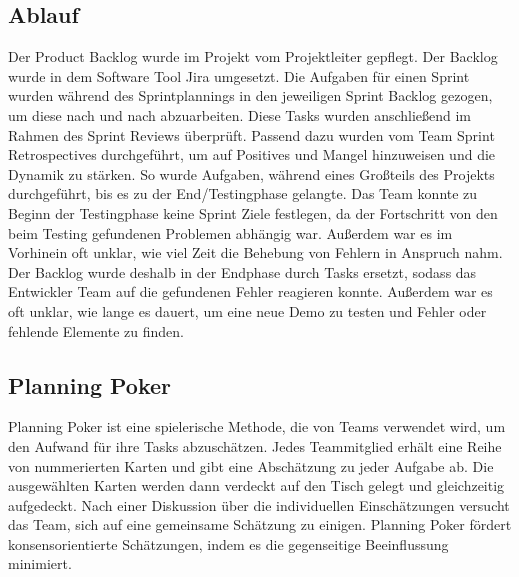 \subsection{Ablauf}\label{subsec:Ablauf}
Der Product Backlog wurde im Projekt vom Projektleiter gepflegt.
Der Backlog wurde in dem Software Tool Jira umgesetzt.
Die Aufgaben für einen Sprint wurden während des Sprintplannings in den jeweiligen Sprint Backlog gezogen, um diese nach und nach abzuarbeiten.
Diese Tasks wurden anschließend im Rahmen des Sprint Reviews überprüft.
Passend dazu wurden vom Team Sprint Retrospectives durchgeführt, um auf Positives und Mangel hinzuweisen und die Dynamik zu stärken.
So wurde Aufgaben, während eines Großteils des Projekts durchgeführt, bis es zu der End/Testingphase gelangte.
Das Team konnte zu Beginn der Testingphase keine Sprint Ziele festlegen, da der Fortschritt von den beim Testing gefundenen Problemen abhängig war.
Außerdem war es im Vorhinein oft unklar, wie viel Zeit die Behebung von Fehlern in Anspruch nahm.
Der Backlog wurde deshalb in der Endphase durch Tasks ersetzt, sodass das Entwickler Team auf die gefundenen Fehler reagieren konnte.
Außerdem war es oft unklar, wie lange es dauert, um eine neue Demo zu testen und Fehler oder fehlende Elemente zu finden.

\subsection{Planning Poker}\label{subsec:Planning-Poker}
Planning Poker ist eine spielerische Methode, die von Teams verwendet wird, um den Aufwand für ihre Tasks abzuschätzen.
Jedes Teammitglied erhält eine Reihe von nummerierten Karten und gibt eine Abschätzung zu jeder Aufgabe ab.
Die ausgewählten Karten werden dann verdeckt auf den Tisch gelegt und gleichzeitig aufgedeckt.
Nach einer Diskussion über die individuellen Einschätzungen versucht das Team, sich auf eine gemeinsame Schätzung zu einigen.
Planning Poker fördert konsensorientierte Schätzungen, indem es die gegenseitige Beeinflussung minimiert. 

\renewcommand{\kapitelautor}{}